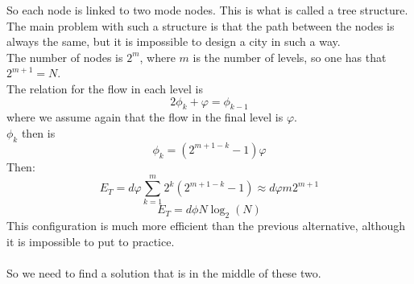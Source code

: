 So each node is linked to two mode nodes. This is what is called a tree structure. \\
The main problem with such a structure is that the path between the nodes is always the same, but it is impossible to design a city in such a way. \\
The number of nodes is $2^m$, where $m$ is the number of levels, so one has that $2^{m+1} = N$. \\
The relation for the flow in each level is
$$
	2\phi_k + \varphi = \phi_{k-1}
$$
where we assume again that the flow in the final level is $\varphi$. \\
$\phi_k$ then is
$$
	\phi_k = (2^{m+1-k}-1)\varphi
$$
Then:
$$
	E_T = d\varphi\sum_{k=1}^m 2^k(2^{m+1-k}-1) \approx d\varphi m 2^{m+1}	
$$
$$
	E_T = d\phi N \log_2(N)
$$
This configuration is much more efficient than the previous alternative, although it is impossible to put to practice. \\ \\ 
So we need to find a solution that is in the middle of these two. 
